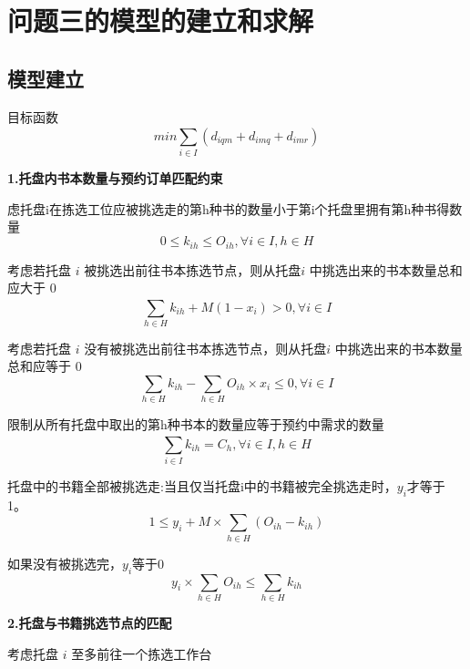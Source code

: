 \documentclass[withoutpreface,bwprint]{thesis-config}
\begin{document}
    
\clearpage
\section{问题三的模型的建立和求解}
\subsection{模型建立}
\par 目标函数
\begin{equation}
   min \sum_{i\in I }^{} (d_{iqm}+d_{imq}+d_{imr})
\end{equation}
\par \textbf{1.托盘内书本数量与预约订单匹配约束}
\par 虑托盘i在拣选工位应被挑选走的第h种书的数量小于第i个托盘里拥有第h种书得数量
\begin{equation}
    0 \le k_{ih} \le O_{ih}, \forall i \in I,h \in H
\end{equation}
\par 考虑若托盘 $i$ 被挑选出前往书本拣选节点，则从托盘$i$ 中挑选出来的书本数量总和应大于 0
\begin{equation}
    \sum _ {h \in H}^ {} k_{ih} +M(1-  x_ {i}  )>0,  \forall i \in I	
\end{equation}
\par 考虑若托盘 $i$ 没有被挑选出前往书本拣选节点，则从托盘$i$ 中挑选出来的书本数量总和应等于 0
\begin{equation}
    \sum_{h \in H}{}k_{ih}- \sum_{h \in H}{}O_{ih}×x_i\leqslant 0, \forall i\in I	
\end{equation}
\par 限制从所有托盘中取出的第h种书本的数量应等于预约中需求的数量
\begin{equation}
    \sum _ {i\in I}^ {}  k_ {ih} =  C_ {h} ,  \forall  i  \in I,h  \in  H	
\end{equation}
\par 托盘中的书籍全部被挑选走:当且仅当托盘i中的书籍被完全挑选走时，$y_i$才等于 1。
\begin{equation}
    1 \leqslant y_i+M×\sum_{h \in H} (O_{ih} - k_{ih} )	
\end{equation}
\par 如果没有被挑选完，$y_i$等于0
\begin{equation}
    y_i × \sum_{h \in H}O_{ih} \leqslant\sum_{h \in H}k_{ih}	
\end{equation}
\par \textbf{2.托盘与书籍挑选节点的匹配}
\par 考虑托盘 $i$ 至多前往一个拣选工作台
\end{document}

